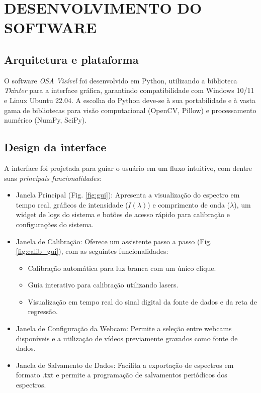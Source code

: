 \documentclass[a4paper]{ifacconf}
\begin{document}
\section{DESENVOLVIMENTO DO SOFTWARE}
\label{sec:software}

\subsection{Arquitetura e plataforma}
O software \textit{OSA Visível} foi desenvolvido em Python, utilizando a biblioteca \textit{Tkinter} para a interface gráfica, garantindo compatibilidade com Windows 10/11 e Linux Ubuntu 22.04. A escolha do Python deve-se à sua portabilidade e à vasta gama de bibliotecas para visão computacional (OpenCV, Pillow) e processamento numérico (NumPy, SciPy).

\subsection{Design da interface}

A interface foi projetada para guiar o usuário em um fluxo intuitivo, com dentre suas \textit{principais funcionalidades}:

\begin{itemize}
    \item Janela Principal (Fig. \ref{fig:gui}): Apresenta a visualização do espectro em tempo real, gráficos de intensidade ($I(\lambda)$) e comprimento de onda ($\lambda$), um widget de logs do sistema e botões de acesso rápido para calibração e configurações do sistema.
    \item Janela de Calibração: Oferece um assistente passo a passo (Fig. \ref{fig:calib_gui}), com as seguintes funcionalidades:
    \begin{itemize}
        \item Calibração automática para luz branca com um único clique.
        \item Guia interativo para calibração utilizando lasers.
        \item Visualização em tempo real do sinal digital da fonte de dados e da reta de regressão.
    \end{itemize}
    \item Janela de Configuração da Webcam: Permite a seleção entre webcams disponíveis e a utilização de vídeos previamente gravados como fonte de dados.
    \item Janela de Salvamento de Dados: Facilita a exportação de espectros em formato .txt e permite a programação de salvamentos periódicos dos espectros.
\end{itemize}
\end{document}
